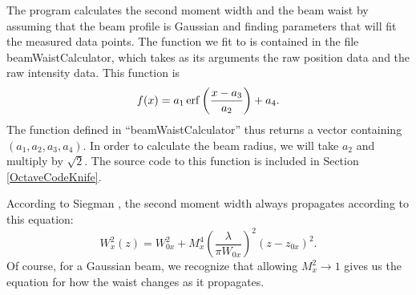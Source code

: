 The program calculates the second moment width and the beam waist by assuming that the beam profile is Gaussian and finding parameters that will fit the measured data points. The function we fit to is contained in the file beamWaistCalculator, which takes as its arguments the raw position data and the raw intensity data. This function is 
\begin{equation}\label{fiterfeqn}
f(x)=a_1 \operatorname{erf} \left(\frac{x-a_3}{a_2}\right)+a_4.
\end{equation}
The function defined in ``beamWaistCalculator'' thus returns a vector containing $(a_1, a_2, a_3, a_4)$. In order to calculate the beam radius, we will take $a_2$ and multiply by $\sqrt{2}$. The source code to this function is included in Section\,\ref{OctaveCodeKnife}.

According to Siegman \cite{SiegmanBeamQuality}, the second moment width always propagates according to this equation: 
\begin{equation}
W_x^2(z)=W_{0x}^2 + M_x^4 \left( \frac{\lambda}{\pi W_{0x}}\right)^2 (z-z_{0x})^2. 
\end{equation}
Of course, for a Gaussian beam, we recognize that allowing $M_x^2\rightarrow 1$ gives us the equation for how the waist changes as it propagates. 
